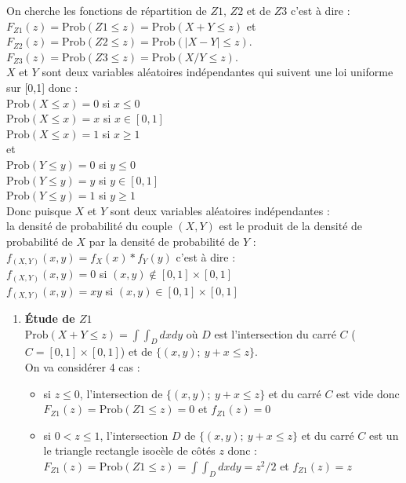 \documentclass[a4paper,11pt]{book}
\begin{document}
\begin{enumerate}
On cherche les fonctions de r\'epartition de $Z1$, $Z2$ et de $Z3$ c'est \`a 
dire :\\
$F_{Z1}(z)=\mbox{Prob}(Z1\leq z)=\mbox{Prob}(X+Y\leq z)$ et\\
$F_{Z2}(z)=\mbox{Prob}(Z2\leq z)=\mbox{Prob}(|X-Y|\leq z)$.\\
$F_{Z3}(z)=\mbox{Prob}(Z3\leq z)=\mbox{Prob}(X/Y\leq z)$.\\
$X$ et $Y$ sont deux variables al\'eatoires ind\'ependantes qui suivent une loi
uniforme sur [0,1] donc :\\
$\mbox{Prob}(X\leq x)=0$ si $x\leq 0$\\
$\mbox{Prob}(X\leq x)=x$ si $x\in[0,1]$\\
$\mbox{Prob}(X\leq x)=1$ si $x\geq 1$\\
et\\
$\mbox{Prob}(Y\leq y)=0$ si $y\leq 0$\\
$\mbox{Prob}(Y\leq y)=y$ si $y\in[0,1]$\\
$\mbox{Prob}(Y\leq y)=1$ si $y\geq 1$\\
Donc puisque $X$ et $Y$ sont deux variables al\'eatoires ind\'ependantes :\\
la densit\'e de probabilit\'e du couple $(X,Y)$ est le produit de la
densit\'e de probabilit\'e de $X$ par la densit\'e de probabilit\'e de $Y$ :\\
$f_{(X,Y)}(x,y)=f_X(x)*f_Y(y)$ c'est \`a dire :\\
$f_{(X,Y)}(x,y)=0$ si $(x,y)\notin [0,1]\times [0,1]$\\
$f_{(X,Y)}(x,y)=xy$ si $(x,y)\in [0,1]\times [0,1]$\\
\begin{enumerate}
\item {\bf \'Etude de $Z1$}\\
$\mbox{Prob}(X+Y\leq z)=\int\int_Ddxdy$ o\`u $D$ est l'intersection du carr\'e 
$C$ ($C=[0,1]\times [0,1]$) et de $\{(x,y);\  y+x\leq z\}$.\\
On va consid\'erer 4 cas :
\begin{itemize}
\item si $z\leq 0$, l'intersection de $\{(x,y);\   y+x\leq z\}$ et du carr\'e $C$ est vide donc
 $F_{Z1}(z)=\mbox{Prob}(Z1\leq z)=0$ et $f_{Z1}(z)=0$
\item si $0<z\leq 1$, l'intersection $D$ de $\{(x,y);\   y+x\leq z\}$ et du 
carr\'e $C$ est un le triangle rectangle isoc\`ele de c\^ot\'es $z$ donc :\\
$F_{Z1}(z)=\mbox{Prob}(Z1\leq z)=\int\int_Ddxdy=z^2/2$ et $f_{Z1}(z)=z$

\end{itemize}
\end{enumerate}
\end{enumerate}
\end{document}
